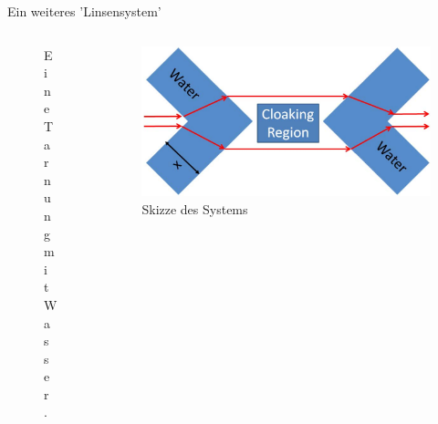 \begin{frame}{Ein weiteres 'Linsensystem'}
\begin{columns}
\begin{column}{0.48\textwidth}
\begin{figure}
\begin{subfigure}{\textwidth}
                \end{subfigure}
                \caption{Eine Tarnung mit Wasser.}
            \end{figure}
        \end{column}
        \begin{column}{0.48\textwidth}
            \begin{figure}
                \centering
                \caption{Skizze des Systems}
                \includegraphics[height=0.3\textheight]{images/fresnel-skizze.png}
            \end{figure}
        \end{column}
    \end{columns}
\end{frame}
